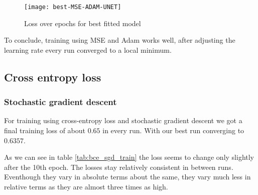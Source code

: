 \begin{figure}[h]
    \texttt{[image: best-MSE-ADAM-UNET]}
    \caption{\label{im:best-MSE-ADAM-UNET} Loss over epochs for best fitted model}
\end{figure}

To conclude, training using MSE and Adam works well, after adjusting the learning rate every run converged 
to a local minimum.

\subsection{Cross entropy loss}
\subsubsection{Stochastic gradient descent}
 For training using cross-entropy loss and stochastic gradient descent we got a final training loss
 of about $0.65$ in every run. With our best run converging to $0.6357$. 

 As we can see in table \ref{tab:bce_sgd_train} the loss seems to change only slightly after the 10th epoch.
 The losses stay relatively consistent in between runs. Eventhough they vary in absolute terms about the same,
 they vary much less in relative terms as they are almost three times as high.

 

